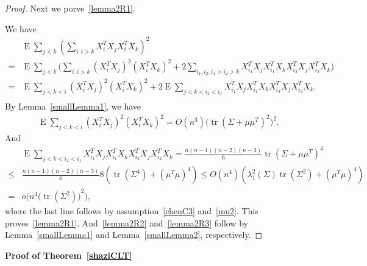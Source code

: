 \documentclass[review]{elsarticle}
\DeclareMathOperator{\mytr}{tr}
\DeclareMathOperator{\myE}{E}
\theoremstyle{plain}
\theoremstyle{definition}
\theoremstyle{remark}
\begin{document}
\begin{proof}
    Next we porve~\eqref{lemma2R1}.


    We have
    \begin{equation*}
    \begin{aligned}
        &\myE\sum_{j<k}{(\sum_{i:i>k}X_i^T X_j X_i^T X_k)}^2\\
        =&
        \myE\sum_{j<k}\Big(\sum_{i:i>k}(X_i^T X_j)^2 (X_i^T X_k)^2
        +2\sum_{i_1,i_2:i_1>i_2>k}X_{i_1}^T X_j X_{i_1}^T X_k X_{i_2}^T X_j X_{i_2}^T X_k\Big)\\
        =&
        \myE\sum_{j<k<i}(X_i^T X_j)^2 (X_i^T X_k)^2
        +2\myE\sum_{j<k<i_2<i_1}X_{i_1}^T X_j X_{i_1}^T X_k X_{i_2}^T X_j X_{i_2}^T X_k.\\
    \end{aligned}
    \end{equation*}
    By Lemma~\ref{smallLemma1}, we have
    \begin{equation*}
    \begin{aligned}
        \myE\sum_{j<k<i}(X_i^T X_j)^2 (X_i^T X_k)^2    =O(n^3)\big(\mytr (\Sigma+\mu\mu^T)^2\big)^2.
    \end{aligned}
    \end{equation*}
And
    \begin{equation*}
    \begin{aligned}
        &\myE\sum_{j<k<i_2<i_1}X_{i_1}^T X_j X_{i_1}^T X_k X_{i_2}^T X_j X_{i_2}^T X_k
        =\frac{n(n-1)(n-2)(n-3)}{6}\mytr {(\Sigma+\mu\mu^T)}^4\\
        \leq& \frac{n(n-1)(n-2)(n-3)}{6}8(\mytr (\Sigma^4)+(\mu^T \mu)^4)
        \leq O(n^4)(\lambda_{1}^2(\Sigma)\mytr (\Sigma^2)+(\mu^T \mu)^4)\\
        =&
        o\Big(n^4{\big(\mytr (\Sigma^2)\big)}^2\Big),
    \end{aligned}
    \end{equation*}
    where the last line follows by assumption~\eqref{chenC3} and~\eqref{mu2}.
    This proves~\eqref{lemma2R1}. And~\eqref{lemma2R2} and~\eqref{lemma2R3} follow by Lemma~\ref{smallLemma1} and Lemma~\ref{smallLemma2}, respectively.

\end{proof}

\textbf{Proof of Theorem~\ref{shaziCLT}}
\end{document}
